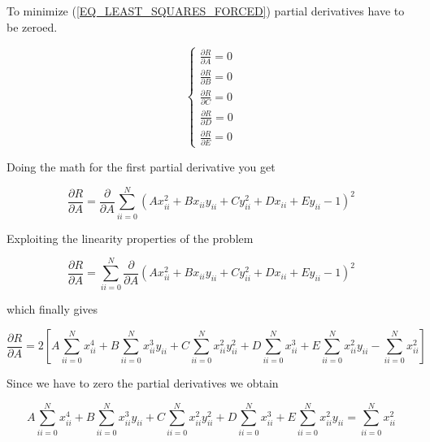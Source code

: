 \documentclass[main]{subfiles}
\begin{document}
To minimize (\ref{EQ_LEAST_SQUARES_FORCED}) partial derivatives have to be zeroed.

\begin{equation}
    \begin{cases}
        \frac{\partial R}{\partial A} = 0\\
        \frac{\partial R}{\partial B} = 0\\
        \frac{\partial R}{\partial C} = 0\\
        \frac{\partial R}{\partial D} = 0\\
        \frac{\partial R}{\partial E} = 0
    \end{cases}
\end{equation}

Doing the math for the first partial derivative you get

\begin{equation}
    \frac{\partial R}{\partial A} = \frac{\partial}{\partial A}\sum_{ii=0}^{N} 
    \left(A x_{ii}^2 + B x_{ii}y_{ii} + C y_{ii}^2 + D x_{ii} + E y_{ii} -1\right)^2
\end{equation}

Exploiting the linearity properties of the problem

\begin{equation}
    \frac{\partial R}{\partial A} = \sum_{ii=0}^{N} \frac{\partial}{\partial A}
    \left(A x_{ii}^2 + B x_{ii}y_{ii} + C y_{ii}^2 + D x_{ii} + E y_{ii} -1\right)^2
\end{equation}

which finally gives

\begin{equation}
    \frac{\partial R}{\partial A} = 2\left[A \sum_{ii=0}^{N} x_{ii}^4 + 
                                           B \sum_{ii=0}^{N} x_{ii}^3y_{ii} + 
                                           C \sum_{ii=0}^{N} x_{ii}^2y_{ii}^2 + 
                                           D \sum_{ii=0}^{N} x_{ii}^3 + 
                                           E \sum_{ii=0}^{N} x_{ii}^2y_{ii} - 
                                             \sum_{ii=0}^{N} x_{ii}^2\right] 
\end{equation}

Since we have to zero the partial derivatives we obtain

\begin{equation}
    A \sum_{ii=0}^{N} x_{ii}^4 + 
    B \sum_{ii=0}^{N} x_{ii}^3y_{ii} + 
    C \sum_{ii=0}^{N} x_{ii}^2y_{ii}^2 + 
    D \sum_{ii=0}^{N} x_{ii}^3 + 
    E \sum_{ii=0}^{N} x_{ii}^2y_{ii}= \sum_{ii=0}^{N} x_{ii}^2
\end{equation}
\end{document}
